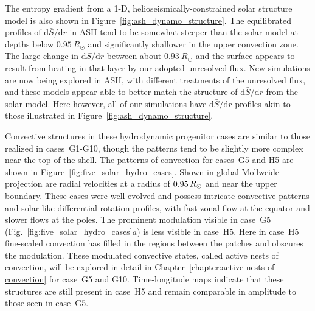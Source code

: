 The entropy gradient from a 1-D, helioseismically-constrained solar
structure model is also shown in Figure~\ref{fig:ash_dynamo_structure}.  
The equilibrated profiles of $\mathrm{d}\bar{S}/\mathrm{d}r$ in ASH
tend to be somewhat steeper than the solar model at depths below
$0.95\: R_\odot$ and significantly shallower in the upper convection
zone.  The large change in $\mathrm{d}\bar{S}/\mathrm{d}r$ between
about $0.93\: R_\odot$ and the surface appears to result from heating
in that layer by our adopted unresolved flux.  New simulations are now
being explored in ASH, with different treatments of the unresolved
flux, and these models appear able to better match the structure
of $\mathrm{d}\bar{S}/\mathrm{d}r$ from the solar model.  Here
however, all of our simulations have $\mathrm{d}\bar{S}/\mathrm{d}r$  
profiles akin to those illustrated in Figure~\ref{fig:ash_dynamo_structure}. 

\clearpage
Convective structures in these hydrodynamic progenitor cases are
similar to those realized in cases~G1-G10, though the patterns tend to
be slightly more complex near the top of the shell.
The patterns of convection for cases~G5 and H5 are shown in
Figure~\ref{fig:five_solar_hydro_cases}.  Shown in global Mollweide
projection are radial velocities at a radius of
$0.95\thinspace R_\odot$ and near the upper boundary. 
These cases were well evolved and possess intricate convective
patterns and solar-like differential rotation profiles, with fast
zonal flow at the equator and slower flows at the poles.
The prominent modulation visible in case~G5
(Fig.~\ref{fig:five_solar_hydro_cases}$a$) is less visible in case~H5.
Here in case~H5 fine-scaled convection has filled in 
the regions between the patches and obscures the modulation. 
These modulated convective states, called
active nests of convection, will be explored in detail in
Chapter~\ref{chapter:active nests of convection} for case~G5 and G10.
Time-longitude maps indicate that these structures are still present
in case~H5 and remain comparable in amplitude to those seen in case~G5.


